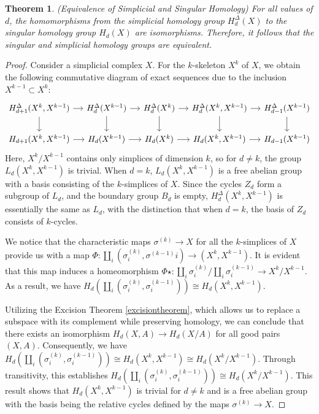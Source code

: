 \documentclass{amsart}
\newtheorem{theorem}[section]{Theorem}
\begin{document}
\begin{theorem}{(Equivalence of Simplicial and Singular Homology)}
For all values of $d$, the homomorphisms from the simplicial homology group $H^\Delta_d(X)$ to the singular homology group $H_d(X)$ are isomorphisms. Therefore, it follows that the singular and simplicial homology groups are equivalent.
\end{theorem}

\begin{proof}
Consider a simplicial complex $X$. For the $k$-skeleton $X^k$ of $X$, we obtain the following commutative diagram of exact sequences due to the inclusion $X^{k-1} \subset X^k$:
\begin{equation*}
\begin{tikzcd}[column sep=1.2em]
{H^\Delta_{d+1}(X^k,X^{k-1})} \arrow[d] \arrow[r] & H^\Delta_{d}(X^{k-1}) \arrow[d] \arrow[r] & H^\Delta_{d}(X^k) \arrow[d] \arrow[r] & {H^\Delta_{d}(X^k,X^{k-1})} \arrow[d] \arrow[r] & H^\Delta_{d-1}(X^{k-1}) \arrow[d] \\
{H_{d+1}(X^k,X^{k-1})} \arrow[r]                  & H_{d}(X^{k-1}) \arrow[r]                  & H_{d}(X^k) \arrow[r]                  & {H_{d}(X^k,X^{k-1})} \arrow[r]                  & H_{d-1}(X^{k-1})                 
\end{tikzcd}
\end{equation*}
Here, $X^k/X^{k-1}$ contains only simplices of dimension $k$, so for $d \neq k$, the group $L_d(X^k, X^{k-1})$ is trivial. When $d = k$, $L_d(X^k, X^{k-1})$ is a free abelian group with a basis consisting of the $k$-simplices of $X$. Since the cycles $Z_d$ form a subgroup of $L_d$, and the boundary group $B_d$ is empty, $H^\Delta_d(X^k, X^{k-1})$ is essentially the same as $L_d$, with the distinction that when $d = k$, the basis of $Z_d$ consists of $k$-cycles.

We notice that the characteristic maps $\sigma^{(k)} \rightarrow X$ for all the $k$-simplices of $X$ provide us with a map $\Phi: \coprod_i(\sigma^{(k)}_i, \sigma^{(k-1)}i) \rightarrow (X^k, X^{k-1})$. It is evident that this map induces a homeomorphism $\Phi\star: \coprod_i \sigma^{(k)}_i/\coprod_i \sigma^{(k-1)}_i \rightarrow X^k/X^{k-1}$. As a result, we have $H_d(\coprod_i (\sigma^{(k)}_i, \sigma^{(k-1)}_i)) \cong H_d(X^k, X^{k-1})$.

Utilizing the Excision Theorem \ref{excisiontheorem}, which allows us to replace a subspace with its complement while preserving homology, we can conclude that there exists an isomorphism $H_d(X,A) \rightarrow H_d(X/A)$ for all good pairs $(X,A)$. Consequently, we have $H_d(\coprod_i (\sigma^{(k)}_i, \sigma^{(k-1)}_i)) \cong H_d(X^k, X^{k-1}) \cong H_d(X^k/X^{k-1})$. Through transitivity, this establishes $H_d(\coprod_i (\sigma^{(k)}_i, \sigma^{(k-1)}_i)) \cong H_d(X^k/X^{k-1})$. This result shows that $H_d(X^k, X^{k-1})$ is trivial for $d \neq k$ and is a free abelian group with the basis being the relative cycles defined by the maps $\sigma^{(k)} \rightarrow X$.


\end{proof}
\end{document}
